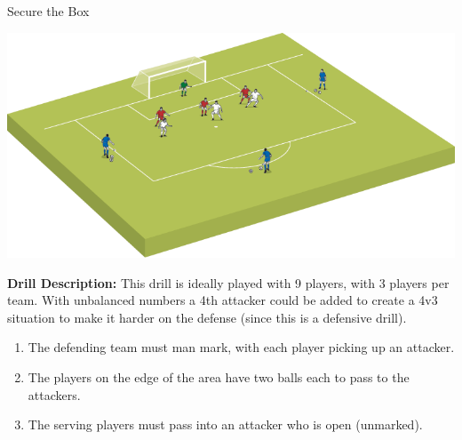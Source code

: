 \begin{evenBlock}{Secure the Box}

\begin{minipage}[t]{\linewidth}
    \centering
    
    \begin{minipage}{.3\linewidth} %
        \includegraphics[width=\textwidth]{../img/Trimmed/SecureTheBox1}
    \end{minipage}
    \hspace{0.05\linewidth}
    \begin{minipage}{.6\linewidth} %
        \textbf{Drill Description:}
        This drill is ideally played with 9 players, with 3 players per team.  With unbalanced numbers a 4th attacker could be added to create a 4v3 situation to make it harder on the defense (since this is a defensive drill).
        \begin{enumerate}
            \setlength{\itemsep}{0pt}
            \setlength{\parskip}{0pt}
            \setlength{\parsep}{0pt}
            \item The defending team must man mark, with each player picking up an attacker.
            \item The players on the edge of the area have two balls each to pass to the attackers.
            \item The serving players must pass into an attacker who is open (unmarked).
        \end{enumerate}
        

\end{minipage}
\end{minipage}
\end{evenBlock}
